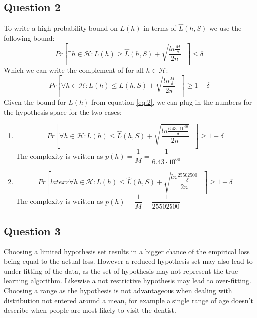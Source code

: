 \documentclass{article}
\begin{document}
\subsection{Question 2}
To write a high probability bound on $L(h)$ in terms of $\hat{L}(h,S)$ we use the following bound:
\begin{equation*}
Pr \left[
\exists h \in \mathcal{H} : L(h) \geq \hat{L}(h,S) +
\sqrt{ \dfrac{ ln \frac{M}{\delta}}{2n}}
 \textbf{ } \right] \leq \delta
\end{equation*}
Which we can write the complement of for all $h \in \mathcal{H}$:
\begin{equation}
Pr \left[
\forall h \in \mathcal{H} : L(h) \leq \hat{L}(h,S) + \sqrt{ \dfrac{ ln \frac{M}{\delta}}{2n}}
 \textbf{ } \right] \geq 1 - \delta
\label{eq:2}
\end{equation}
Given the bound for $L(h)$ from equation \ref{eq:2}, we can plug in the numbers for the hypothesis space for the two cases:
\begin{enumerate}
\item{
\begin{equation*}
Pr \left[
\forall h \in \mathcal{H} : L(h) \leq \hat{L}(h,S) + \sqrt{ \dfrac{ ln \frac{6.43 \cdot 10^{60}}{\delta}}{2n}}
 \textbf{ } \right] \geq 1 - \delta
\end{equation*}
The complexity is written as $p(h) = \dfrac{1}{M} = \dfrac{1}{6.43 \cdot 10^{60}}$
}
\item{
\begin{equation*}
Pr \left[latex r
\forall h \in \mathcal{H} : L(h) \leq \hat{L}(h,S) + \sqrt{ \dfrac{ ln \frac{25502500}{\delta}}{2n}}
 \textbf{ } \right] \geq 1 - \delta
\end{equation*}
}
The complexity is written as $p(h) = \dfrac{1}{M} = \dfrac{1}{25502500}$
\end{enumerate}
\subsection{Question 3}
Choosing a limited hypothesis set results in a bigger chance of the empirical loss being equal to the actual loss. However a reduced hypothesis set may also lead to under-fitting of the data, as the set of hypothesis may not represent the true learning algorithm. Likewise a
not restrictive hypothesis may lead to over-fitting. \\ Choosing a range as the hypothesis is not advantageous when dealing with distribution not entered around a mean, for example a single range of age doesn't describe when people are most likely to visit the dentist.
\end{document}
